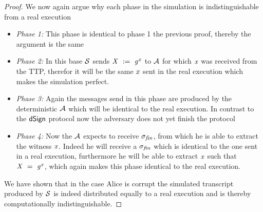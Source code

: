 \begin{proof}
    We now again argue why each phase in the simulation is indistinguishable from a real execution
    \begin{itemize}
        \item \textit{Phase 1:} This phase is identical to phase 1 the previous proof, thereby the argument is the same
        \item \textit{Phase 2:} In this base $\mathcal{S}$ sends $\mathit{X} ~:=~ \mathit{g}^{\mathit{x}}$ to $\mathcal{A}$ for which $\mathit{x}$ was received from the TTP, therefor it will be the same $\mathit{x}$ sent in the real execution which makes the simulation perfect.
        \item \textit{Phase 3:} Again the messages send in this phase are produced by the deterministic $\mathcal{A}$ which will be identical to the real execution.
        In contrast to the $\mathsf{dSign}$ protocol now the adversary does not yet finish the protocol
        \item \textit{Phase 4:} Now the $\mathcal{A}$ expects to receive $\sigma_{\mathit{fin}}$, from which he is able to extract the witness $\mathit{x}$.
        Indeed he will receive a $\sigma_{\mathit{fin}}$ which is identical to the one sent in a real execution, furthermore he will be able to extract $\mathit{x}$ such that $\mathit{X} ~=~ \mathit{g}^{\mathit{x}}$, which again makes this phase identical to the real execution.
    \end{itemize}

    We have shown that in the case Alice is corrupt the simulated transcript produced by $\mathcal{S}$ is indeed distributed equally to a real execution and is thereby computationally indistinguishable.


\end{proof}
